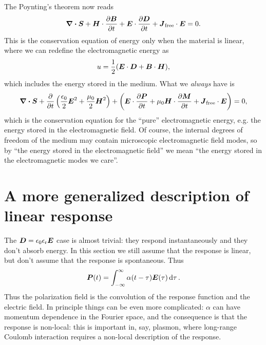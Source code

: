 \documentclass[hyperref, a4paper]{article}
\begin{document}
The Poynting's theorem now reads 
\begin{equation}
    \div{\vb*{S}} + \vb*{H} \cdot \pdv{\vb*{B}}{t} + \vb*{E} \cdot \pdv{\vb*{D}}{t} 
    + \vb*{J}_{\text{free}} \cdot \vb*{E} = 0.
\end{equation}
This is the conservation equation of energy 
only when the material is linear, 
where we can redefine the electromagnetic energy as 
\begin{equation}
    u = \frac{1}{2} (\vb*{E} \cdot \vb*{D} + \vb*{B} \cdot \vb*{H}),
\end{equation} 
which includes the energy stored in the medium.
What we \emph{always} have is 
\begin{equation}
    \div{\vb*{S}} + \pdv{t} \left(
        \frac{\epsilon_0}{2} \vb*{E}^2 
        + \frac{\mu_0}{2} \vb*{H}^2
    \right) + 
    \left(
        \vb*{E} \cdot \pdv{\vb*{P}}{t} 
        + \mu_0 \vb*{H} \cdot \pdv{\vb*{M}}{t}
        + \vb*{J}_{\text{free}} \cdot \vb*{E}
    \right) = 0,
\end{equation} 
which is the conservation equation for the ``pure'' electromagnetic energy, 
e.g. the energy stored in the electromagnetic field.
Of course, the internal degrees of freedom of the medium 
may contain microscopic electromagnetic field modes, 
so by ``the energy stored in the electromagnetic field''
we mean ``the energy stored in the electromagnetic modes we care''.

\section{A more generalized description of linear response}

The $\vb*{D} = \epsilon_0 \epsilon_{\text{r}} \vb*{E}$ case is almost trivial: 
they respond instantaneously and they don't absorb energy.
In this section we still assume that the response is linear,
but don't assume that the response is spontaneous.
Thus 
\begin{equation}
    \vb*{P}(t) = \int_{-\infty}^{\infty} \alpha(t - \tau) \vb*{E}(\tau) \dd{\tau}.
\end{equation}
Thus the polarization field is the convolution 
of the response function and the electric field.
In principle things can be even more complicated: 
$\alpha$ can have momentum dependence in the Fourier space, 
and the consequence is that the response is non-local:
this is important in, say, plasmon, 
where long-range Coulomb interaction requires a non-local description of the response.
\end{document}
